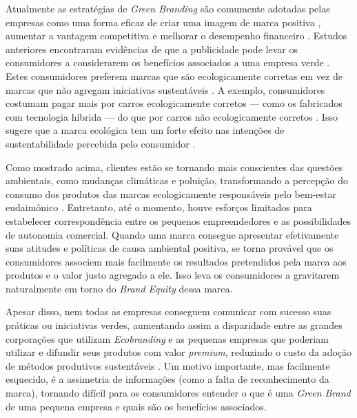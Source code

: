 Atualmente as estratégias de \textit{Green Branding} são comumente adotadas pelas empresas como uma forma eficaz de criar uma imagem de marca positiva \cite{Visser2018664}, aumentar a vantagem competitiva \cite{Chang2012,He2017} e melhorar o desempenho financeiro \cite{Yusof2020GoingPerformance}. Estudos anteriores encontraram evidências de que a publicidade pode levar os consumidores a considerarem os benefícios associados a uma empresa verde \cite{Papista2019ConsumerOutcomes,Barreda2020TheAttachment}. Estes consumidores preferem marcas que são ecologicamente corretas em vez de marcas que não agregam iniciativas sustentáveis \cite{Pimonenko2020,Nadanyiova2020}. A exemplo, consumidores costumam pagar mais por carros ecologicamente corretos — como os fabricados com tecnologia híbrida — do que por carros não ecologicamente corretos \cite{GahlotSarkar2019BrandAppeals,Leckie2021PromotingBrands}. Isso sugere que a marca ecológica tem um forte efeito nas intenções de sustentabilidade percebida pelo consumidor \cite{Lin2012DoubleUsage}.

Como mostrado acima, clientes estão se tornando mais conscientes das questões ambientais, como mudanças climáticas e poluição, transformando a percepção do consumo dos produtos das marcas ecologicamente responsáveis pelo bem-estar eudaimônico \cite{Zhou_2021}. Entretanto, até o momento, houve esforços limitados para estabelecer correspondência entre os pequenos empreendedores e as possibilidades de autonomia comercial. Quando uma marca consegue apresentar efetivamente suas atitudes e políticas de causa ambiental positiva, se torna provável que os consumidores associem mais facilmente os resultados pretendidos pela marca aos produtos e o valor justo agregado a ele. Isso leva os consumidores a gravitarem naturalmente em torno do \textit{Brand Equity} dessa marca.

Apesar disso, nem todas as empresas conseguem comunicar com sucesso suas práticas ou iniciativas verdes, aumentando assim a disparidade entre as grandes corporações que utilizam \textit{Ecobranding} e as pequenas empresas que poderiam utilizar e difundir seus produtos com valor \textit{premium}, reduzindo o custo da adoção de métodos produtivos sustentáveis \cite{Chi2021UnderstandingDestinations}. Um motivo importante, mas facilmente esquecido, é a assimetria de informações (como a falta de reconhecimento da marca), tornando difícil para os consumidores entender o que é uma \textit{Green Brand} de uma pequena empresa e quais são os benefícios associados.

